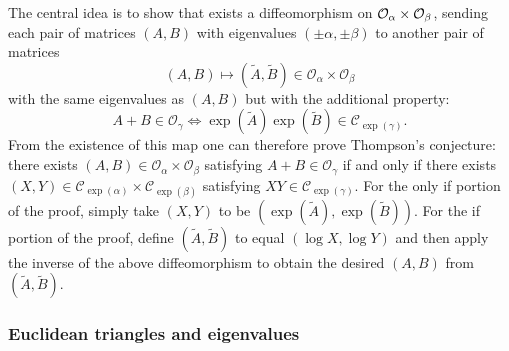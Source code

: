 \documentclass[notitlepage]{article}
\begin{document}
The central idea is to show that exists a diffeomorphism on $\mathcal O_{\alpha} \times \mathcal O_{\beta}$, sending each pair of matrices $(A,B)$ with eigenvalues $(\pm \alpha, \pm \beta)$ to another pair of matrices
\begin{equation}
    (A,B) \mapsto (\tilde A, \tilde B) \in \mathcal O_{\alpha} \times \mathcal O_{\beta}
\end{equation}
with the same eigenvalues as $(A, B)$ but with the additional property:
\begin{equation}
    A + B \in \mathcal O_{\gamma} \iff \exp(\tilde A)\exp(\tilde B) \in \mathcal C_{\exp(\gamma)}.
\end{equation}
From the existence of this map one can therefore prove Thompson's conjecture: there exists $(A,B) \in \mathcal O_{\alpha} \times \mathcal O_{\beta}$ satisfying $A+B\in\mathcal O_{\gamma}$ if and only if there exists $(X,Y) \in \mathcal C_{\exp(\alpha)} \times \mathcal C_{\exp(\beta)}$ satisfying $XY \in \mathcal C_{\exp(\gamma)}$.
For the only if portion of the proof, simply take $(X,Y)$ to be $(\exp(\tilde A), \exp(\tilde B))$.
For the if portion of the proof, define $(\tilde A, \tilde B)$ to equal $(\log X, \log Y)$ and then apply the inverse of the above diffeomorphism to obtain the desired $(A, B)$ from $(\tilde A, \tilde B)$.

\subsubsection{Euclidean triangles and eigenvalues}
\end{document}
